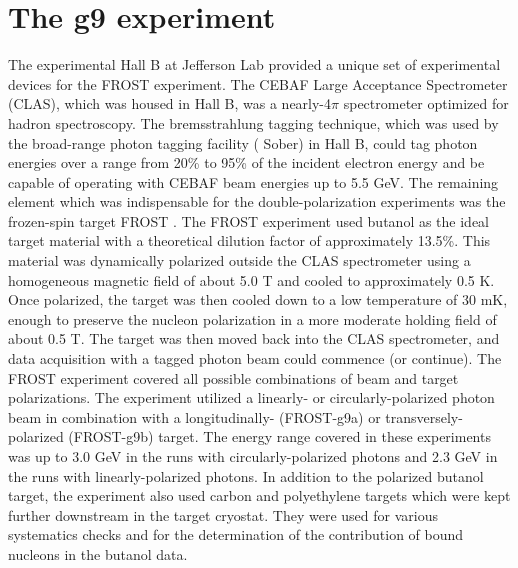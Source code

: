 \section{The g9 experiment}
The experimental Hall B at Jefferson Lab provided a unique set of experimental devices for the FROST experiment. The CEBAF Large Acceptance Spectrometer (CLAS)\cite{CLAS}, which was housed in Hall B, was a nearly-4$\pi$ spectrometer optimized for hadron spectroscopy. The bremsstrahlung tagging technique, which was used by the broad-range photon tagging facility ( Sober\cite{Sober_2000}) in Hall B, could tag photon energies over a range from 20\% to 95\% of the incident electron energy and be capable of operating with CEBAF beam energies up to 5.5 GeV. The remaining element which was indispensable for the double-polarization experiments was the frozen-spin target FROST \cite{Keith_2012}. The FROST experiment used butanol as the ideal target material with a theoretical dilution factor of approximately 13.5\%. This material was dynamically polarized outside the CLAS spectrometer using a homogeneous magnetic field of about 5.0 T and cooled to approximately 0.5 K. Once polarized, the target was then cooled down to a low temperature of 30 mK, enough to preserve the nucleon polarization in a more moderate holding field of about 0.5 T. The target was then moved back into the CLAS spectrometer, and data acquisition with a tagged photon beam could commence (or continue). The FROST experiment covered all possible combinations of beam and target polarizations. The experiment utilized a linearly- or circularly-polarized photon beam in combination with a longitudinally- (FROST-g9a) or transversely-polarized (FROST-g9b) target. The energy range covered in these experiments was up to 3.0 GeV in the runs with circularly-polarized photons and 2.3 GeV in the runs with linearly-polarized photons. In addition to the polarized butanol target, the experiment also used carbon and polyethylene targets which were kept further downstream in the target cryostat. They were used for various systematics checks and for the determination of the contribution of bound nucleons in the butanol data.
